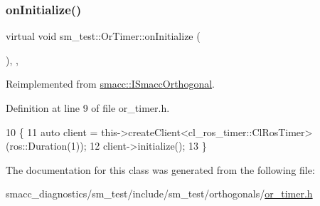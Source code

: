 \subsubsection{\texorpdfstring{on\+Initialize()}{onInitialize()}}
{\footnotesize\ttfamily virtual void sm\+\_\+test\+::\+Or\+Timer\+::on\+Initialize (\begin{DoxyParamCaption}{ }\end{DoxyParamCaption})\hspace{0.3cm}{\ttfamily [inline]}, {\ttfamily [override]}, {\ttfamily [virtual]}}



Reimplemented from \hyperlink{classsmacc_1_1ISmaccOrthogonal_a6bb31c620cb64dd7b8417f8705c79c7a}{smacc\+::\+I\+Smacc\+Orthogonal}.



Definition at line 9 of file or\+\_\+timer.\+h.


\begin{DoxyCode}
10     \{
11         \textcolor{keyword}{auto} client = this->createClient<cl\_ros\_timer::ClRosTimer>(ros::Duration(1));
12         client->initialize();
13     \}
\end{DoxyCode}


The documentation for this class was generated from the following file\+:\begin{DoxyCompactItemize}
\item 
smacc\+\_\+diagnostics/sm\+\_\+test/include/sm\+\_\+test/orthogonals/\hyperlink{smacc__diagnostics_2sm__test_2include_2sm__test_2orthogonals_2or__timer_8h}{or\+\_\+timer.\+h}\end{DoxyCompactItemize}
